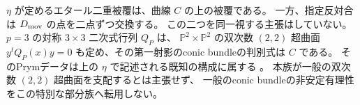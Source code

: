 \begin{remark}[二つの二重構造の区別]
$\eta$ が定めるエタール二重被覆は、曲線 $C$ の上の被覆である。
一方、指定反対合は $D_{\rm mov}$ の点を二点ずつ交換する。
この二つを同一視する主張はしていない。
$p=3$ の対称 $3\times3$ 二次式行列 $Q_P$ は、
$\mathbb P^2\times\mathbb P^2$ の双次数 $(2,2)$ 超曲面
$y^tQ_P(x)y=0$ も定め、その第一射影のconic bundleの判別式は $C$ である。
そのPrymデータは上の $\eta$ で記述される既知の構成に属する
\cite[\S1--2]{BoehningBothmerPrym}。
本族が一般の双次数 $(2,2)$ 超曲面を支配するとは主張せず、
一般のconic bundleの非安定有理性をこの特別な部分族へ転用しない。
\end{remark}
